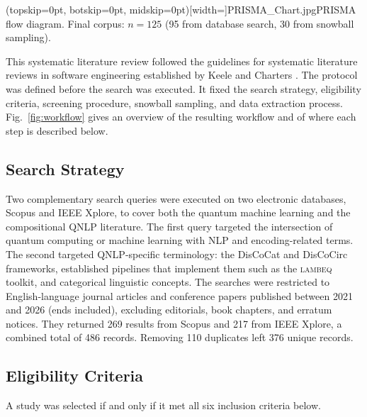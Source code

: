 \documentclass{ieeeaccess}
\begin{document}
\Figure[t!](topskip=0pt, botskip=0pt, midskip=0pt)[width=\textwidth]{PRISMA_Chart.jpg}{PRISMA flow diagram. Final corpus: $n = 125$ (95 from database search, 30 from snowball sampling).\label{fig:prisma}}

This systematic literature review followed the guidelines for systematic literature reviews in software engineering established by Keele and Charters \cite{keele2007guidelines}. The protocol was defined before the search was executed. It fixed the search strategy, eligibility criteria, screening procedure, snowball sampling, and data extraction process. Fig.~\ref{fig:workflow} gives an overview of the resulting workflow and of where each step is described below.

\subsection{Search Strategy}
\label{subsec:search}
Two complementary search queries were executed on two electronic databases, Scopus and IEEE Xplore, to cover both the quantum machine learning and the compositional QNLP literature. The first query targeted the intersection of quantum computing or machine learning with NLP and encoding-related terms. The second targeted QNLP-specific terminology: the DisCoCat and DisCoCirc frameworks, established pipelines that implement them such as the \textsc{lambeq} toolkit, and categorical linguistic concepts. The searches were restricted to English-language journal articles and conference papers published between 2021 and 2026 (ends included), excluding editorials, book chapters, and erratum notices. They returned 269 results from Scopus and 217 from IEEE Xplore, a combined total of 486 records. Removing 110 duplicates left 376 unique records.

\subsection{Eligibility Criteria}
\label{sec:criteria}

A study was selected if and only if it met all six inclusion criteria below.
\end{document}
